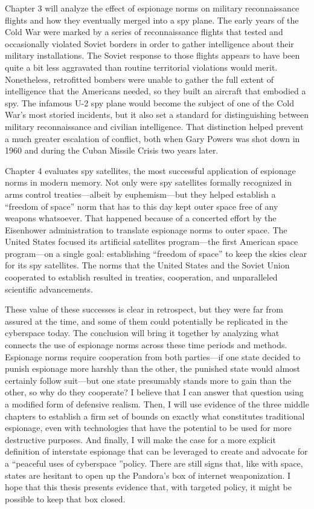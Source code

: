 \documentclass{memoir}
\begin{document}
\begin{refsegment}
Chapter 3 will analyze the effect of espionage norms on military reconnaissance flights and how they eventually merged into a spy plane. The early years of the Cold War were marked by a series of reconnaissance flights that tested and occasionally violated Soviet borders in order to gather intelligence about their military installations. The Soviet response to those flights appears to have been quite a bit less aggravated than routine territorial violations would merit. Nonetheless, retrofitted bombers were unable to gather the full extent of intelligence that the Americans needed, so they built an aircraft that embodied a spy. The infamous U-2 spy plane would become the subject of one of the Cold War's most storied incidents, but it also set a standard for distinguishing between military reconnaissance and civilian intelligence. That distinction helped prevent a much greater escalation of conflict, both when Gary Powers was shot down in 1960 and during the Cuban Missile Crisis two years later.

Chapter 4 evaluates spy satellites, the most successful application of espionage norms in modern memory. Not only were spy satellites formally recognized in arms control treaties---albeit by euphemism---but they helped establish a ``freedom of space'' norm that has to this day kept outer space free of any weapons whatsoever. That happened because of a concerted effort by the Eisenhower administration to translate espionage norms to outer space. The United States focused its artificial satellites program---the first American space program---on a single goal: establishing ``freedom of space'' to keep the skies clear for its spy satellites. The norms that the United States and the Soviet Union cooperated to establish resulted in treaties, cooperation, and unparalleled scientific advancements.

These value of these successes is clear in retrospect, but they were far from assured at the time, and some of them could potentially be replicated in the cyberspace today. The conclusion will bring it together by analyzing what connects the use of espionage norms across these time periods and methods. Espionage norms require cooperation from both parties---if one state decided to punish espionage more harshly than the other, the punished state would almost certainly follow suit---but one state presumably stands more to gain than the other, so why do they cooperate? I believe that I can answer that question using a modified form of defensive realism. Then, I will use evidence of the three middle chapters to establish a firm set of bounds on exactly what constitutes traditional espionage, even with technologies that have the potential to be used for more destructive purposes. And finally, I will make the case for a more explicit definition of interstate espionage that can be leveraged to create and advocate for a ``peaceful uses of cyberspace ''policy. There are still signs that, like with space, states are hesitant to open up the Pandora's box of internet weaponization. I hope that this thesis presents evidence that, with targeted policy, it might be possible to keep that box closed.


\end{refsegment}
\end{document}
